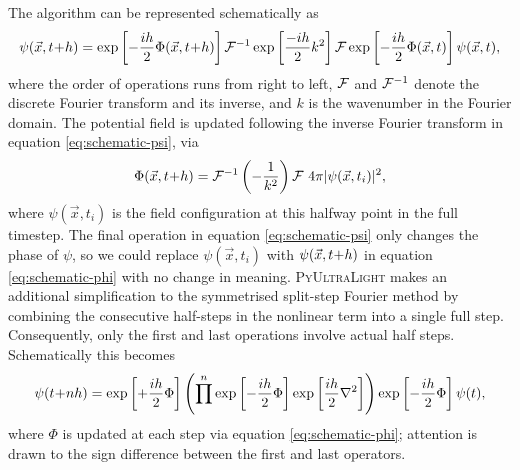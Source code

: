 \documentclass[a4paper,11pt]{article}
\newcommand{\PyUltraLight}{\textsc{PyUltraLight}\xspace}
\begin{document}
The algorithm can be represented schematically as
\begin{equation}\label{eq:schematic-psi}
    \psi(\vec{x},t\hspace*{-.2em}+\hspace*{-.2em}h)=\operatorname{exp}\left[-\frac{ih}{2}\Phi(\vec{x},t\hspace*{-.2em}+\hspace*{-.2em}h)\right]\CMcal{F}^{-1} \operatorname{exp}\left[\frac{-ih}{2}k^2\right]\CMcal{F}\operatorname{exp}\left[-\frac{ih}{2}\Phi(\vec{x},t)\right]\psi(\vec{x},t),
\end{equation}
where the order of operations runs from right to left, $\CMcal{F}$ and $\CMcal{F}^{-1}$ denote the discrete Fourier transform and its inverse, and $k$ is the wavenumber in the Fourier domain. The potential field is updated following the inverse Fourier transform in equation \ref{eq:schematic-psi}, via
%
\begin{equation}\label{eq:schematic-phi}
    \Phi(\vec{x},t\hspace*{-.2em}+\hspace*{-.2em}h)=\CMcal{F}^{-1}\left(-\frac{1}{k^2}\right)\CMcal{F}\ 4\pi\vert\psi(\vec{x},t_{i})\vert^2,
\end{equation}
%
where $\psi(\vec{x},t_{i})$ is the field configuration at this halfway point in the full timestep. The final operation in equation \ref{eq:schematic-psi}  only changes the phase of  $\psi$, so we could replace $\psi(\vec{x},t_{i})$ with $\psi(\vec{x},t\hspace*{-.2em}+\hspace*{-.2em}h)$ in equation \ref{eq:schematic-phi} with no change in meaning. \PyUltraLight makes an additional simplification to the symmetrised split-step Fourier method by combining the consecutive half-steps in the nonlinear term into a single full step. Consequently, only the first and last operations involve actual half steps. Schematically this becomes 
%
\begin{equation}
    \psi(t\hspace*{-.2em}+\hspace*{-.2em}nh)=\operatorname{exp}\left[+\frac{ih}{2}\Phi\right]\left(\prod^n\operatorname{exp}\left[-\frac{ih}{2}\Phi\right]\operatorname{exp}\left[\frac{ih}{2}\nabla^2\right]\right)\operatorname{exp}\left[-\frac{ih}{2}\Phi\right]\psi(t),
\end{equation}
%
where  $\Phi$  is updated at each step via equation \ref{eq:schematic-phi}; attention is drawn to the sign difference between the first and last operators.
\end{document}
